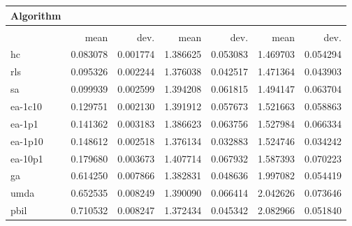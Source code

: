 \begin{tabular}{@{} l *{6}{>{{}}N{1}{2}} @{}}
\toprule
{Algorithm} &  \\
\midrule
&  &  &  \\
\midrule
& {mean} & {dev.} & {mean} & {dev.} & {mean} & {dev.} \\
\midrule
hc & 0.083078 & 0.001774 & 1.386625 & 0.053083 & 1.469703 & 0.054294 \\
rls & 0.095326 & 0.002244 & 1.376038 & 0.042517 & 1.471364 & 0.043903 \\
sa & 0.099939 & 0.002599 & 1.394208 & 0.061815 & 1.494147 & 0.063704 \\
ea-1c10 & 0.129751 & 0.002130 & 1.391912 & 0.057673 & 1.521663 & 0.058863 \\
ea-1p1 & 0.141362 & 0.003183 & 1.386623 & 0.063756 & 1.527984 & 0.066334 \\
ea-1p10 & 0.148612 & 0.002518 & 1.376134 & 0.032883 & 1.524746 & 0.034242 \\
ea-10p1 & 0.179680 & 0.003673 & 1.407714 & 0.067932 & 1.587393 & 0.070223 \\
ga & 0.614250 & 0.007866 & 1.382831 & 0.048636 & 1.997082 & 0.054419 \\
umda & 0.652535 & 0.008249 & 1.390090 & 0.066414 & 2.042626 & 0.073646 \\
pbil & 0.710532 & 0.008247 & 1.372434 & 0.045342 & 2.082966 & 0.051840 \\
\bottomrule
\end{tabular}
